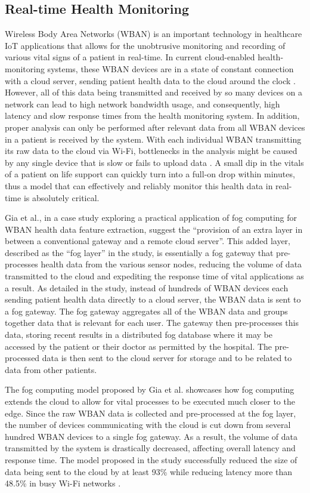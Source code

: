 \documentclass{article}
\begin{document}
\subsection{Real-time Health Monitoring}
Wireless Body Area Networks (WBAN) is an important technology in healthcare IoT applications that allows for the unobtrusive monitoring and recording of various vital signs of a patient in real-time. In current cloud-enabled health-monitoring systems, these WBAN devices are in a state of constant connection with a cloud server, sending patient health data to the cloud around the clock \cite{gia2015fog}. However, all of this data being transmitted and received by so many devices on a network can lead to high network bandwidth usage, and consequently, high latency and slow response times from the health monitoring system. In addition, proper analysis can only be performed after relevant data from all WBAN devices in a patient is received by the system. With each individual WBAN transmitting its raw data to the cloud via Wi-Fi, bottlenecks in the analysis might be caused by any single device that is slow or fails to upload data \cite{gia2015fog}. A small dip in the vitals of a patient on life support can quickly turn into a full-on drop within minutes, thus a model that can effectively and reliably monitor this health data in real-time is absolutely critical.

Gia et al., in a case study exploring a practical application of fog computing for WBAN health data feature extraction,  suggest the ``provision of an extra layer in between a conventional gateway and a remote cloud server''\cite{gia2015fog}. This added layer, described as the ``fog layer'' in the study, is essentially a fog gateway that pre-processes health data from the various sensor nodes, reducing the volume of data transmitted to the cloud and expediting the response time of vital applications as a result. As detailed in the study, instead of hundreds of WBAN devices each sending patient health data directly to a cloud server, the WBAN data is sent to a fog gateway. The fog gateway aggregates all of the WBAN data and groups together data that is relevant for each user. The gateway then pre-processes this data, storing recent results in a distributed fog database where it may be accessed by the patient or their doctor as permitted by the hospital. The pre-processed data is then sent to the cloud server for storage and to be related to data from other patients.

The fog computing model proposed by Gia et al. showcases how fog computing extends the cloud to allow for vital processes to be executed much closer to the edge. Since the raw WBAN data is collected and pre-processed at the fog layer, the number of devices communicating with the cloud is cut down from several hundred WBAN devices to a single fog gateway. As a result, the volume of data transmitted by the system is drastically decreased, affecting overall latency and response time. The model proposed in the study successfully reduced the size of data being sent to the cloud by at least 93\% while reducing latency more than 48.5\% in busy Wi-Fi networks \cite{gia2015fog}. 
\end{document}

